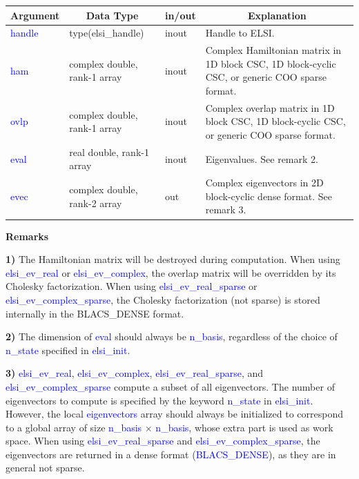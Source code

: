 \documentclass{report}
\begin{document}
\begin{table}[h]
\centering
\begin{tabular}[]{|p{20mm}|p{45mm}|p{15mm}|p{85mm}|}
\hline
\multicolumn{1}{|c|}{\textbf{Argument}} & \multicolumn{1}{c|}{\textbf{Data Type}} & \multicolumn{1}{c|}{\textbf{in/out}} & \multicolumn{1}{c|}{\textbf{Explanation}}\\
\hline
\textcolor{blue}{handle} & type(elsi\_handle)           & inout & Handle to ELSI.\\
\hline
\textcolor{blue}{ham}    & complex double, rank-1 array & inout & Complex Hamiltonian matrix in 1D block CSC, 1D block-cyclic CSC, or generic COO sparse format.\\
\hline
\textcolor{blue}{ovlp}   & complex double, rank-1 array & inout & Complex overlap matrix in 1D block CSC, 1D block-cyclic CSC, or generic COO sparse format.\\
\hline
\textcolor{blue}{eval}   & real double, rank-1 array    & inout & Eigenvalues. See remark 2.\\
\hline
\textcolor{blue}{evec}   & complex double, rank-2 array & out   & Complex eigenvectors in 2D block-cyclic dense format. See remark 3.\\
\hline
\end{tabular}
\end{table}

\textbf{Remarks}

\textbf{1)} The Hamiltonian matrix will be destroyed during computation. When using \textcolor{blue}{elsi\_ev\_real} or \textcolor{blue}{elsi\_ev\_complex}, the overlap matrix will be overridden by its Cholesky factorization. When using \textcolor{blue}{elsi\_ev\_real\_sparse} or \textcolor{blue}{elsi\_ev\_complex\_sparse}, the Cholesky factorization (not sparse) is stored internally in the BLACS\_DENSE format.

\textbf{2)} The dimension of \textcolor{blue}{eval} should always be \textcolor{blue}{n\_basis}, regardless of the choice of \textcolor{blue}{n\_state} specified in \textcolor{blue}{elsi\_init}.

\textbf{3)} \textcolor{blue}{elsi\_ev\_real}, \textcolor{blue}{elsi\_ev\_complex}, \textcolor{blue}{elsi\_ev\_real\_sparse}, and \textcolor{blue}{elsi\_ev\_complex\_sparse} compute a subset of all eigenvectors. The number of eigenvectors to compute is specified by the keyword \textcolor{blue}{n\_state} in \textcolor{blue}{elsi\_init}. However, the local \textcolor{blue}{eigenvectors} array should always be initialized to correspond to a global array of size \textcolor{blue}{n\_basis} $\times$ \textcolor{blue}{n\_basis}, whose extra part is used as work space. When using \textcolor{blue}{elsi\_ev\_real\_sparse} and \textcolor{blue}{elsi\_ev\_complex\_sparse}, the eigenvectors are returned in a dense format (\textcolor{blue}{BLACS\_DENSE}), as they are in general not sparse.
\end{document}
